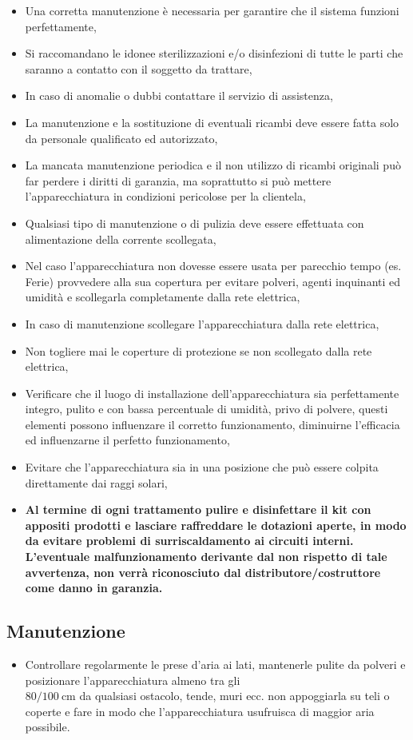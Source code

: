 \documentclass[a4paper]{article}
\begin{document}
\begin{itemize}
  \item Una corretta manutenzione è necessaria per garantire che il sistema funzioni perfettamente,
  \item Si raccomandano le idonee sterilizzazioni e/o disinfezioni di tutte le parti che saranno a contatto con il soggetto da trattare,
  \item In caso di anomalie o dubbi contattare il servizio di assistenza,
  \item La manutenzione e la sostituzione di eventuali ricambi deve essere fatta solo da personale qualificato ed autorizzato,
  \item La mancata manutenzione periodica e il non utilizzo di ricambi originali può far perdere i diritti di garanzia, ma soprattutto si può mettere l'apparecchiatura in condizioni pericolose per la clientela,
  \item Qualsiasi tipo di manutenzione o di pulizia deve essere effettuata con alimentazione della corrente scollegata,
  \item Nel caso l'apparecchiatura non dovesse essere usata per parecchio tempo (es. Ferie) provvedere alla sua copertura per evitare polveri, agenti inquinanti ed umidità e scollegarla completamente dalla rete elettrica,
  \item In caso di manutenzione scollegare l'apparecchiatura dalla rete elettrica,
  \item Non togliere mai le coperture di protezione se non scollegato dalla rete elettrica,
  \item Verificare che il luogo di installazione dell'apparecchiatura sia perfettamente integro, pulito e con bassa percentuale di umidità, privo di polvere, questi elementi possono influenzare il corretto funzionamento, diminuirne l'efficacia ed influenzarne il perfetto funzionamento,
  \item Evitare che l'apparecchiatura sia in una posizione che può essere colpita direttamente dai raggi solari,
  \item \textbf{Al termine di ogni trattamento pulire e disinfettare il kit con appositi prodotti e lasciare raffreddare le dotazioni aperte, in modo da evitare problemi di surriscaldamento ai circuiti interni. L'eventuale malfunzionamento derivante dal non rispetto di tale avvertenza, non verrà riconosciuto dal distributore/costruttore come danno in garanzia.}
\end{itemize}

\subsection{Manutenzione}
\begin{itemize}
  \item Controllare regolarmente le prese d'aria ai lati, mantenerle pulite da polveri e posizionare l'apparecchiatura almeno tra gli\\
$80 / 100 \mathrm{~cm}$ da qualsiasi ostacolo, tende, muri ecc. non appoggiarla su teli o coperte e fare in modo che l'apparecchiatura usufruisca di maggior aria possibile.
\end{itemize}
\end{document}
